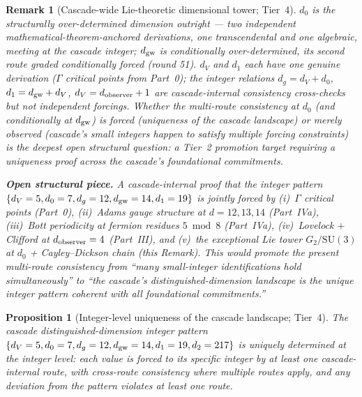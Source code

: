 \documentclass[12pt,a4paper]{article}
\newtheorem{proposition}[theorem]{Proposition}
\newtheorem*{remark}{Remark}
\begin{document}
\begin{remark}[Cascade-wide Lie-theoretic dimensional tower; Tier~4]
$d_0$ is the structurally over-determined dimension outright --- two independent mathematical-theorem-anchored derivations, one transcendental and one algebraic, meeting at the cascade integer; $d_{\rm gw}$ is \emph{conditionally} over-determined, its second route graded conditionally forced (round 51). $d_V$ and $d_1$ each have one genuine derivation ($\Gamma$ critical points from Part~0); the integer relations $d_g = d_V + d_0$, $d_1 = d_{\rm gw} + d_V$, $d_V = d_{\rm observer}+1$ are cascade-internal consistency cross-checks but not independent forcings. Whether the multi-route consistency at $d_0$ (and conditionally at $d_{\rm gw}$) is \emph{forced} (uniqueness of the cascade landscape) or merely \emph{observed} (cascade's small integers happen to satisfy multiple forcing constraints) is the deepest open structural question: a Tier~2 promotion target requiring a uniqueness proof across the cascade's foundational commitments.

\medskip\noindent\textbf{Open structural piece.} A cascade-internal proof that the integer pattern $\{d_V=5, d_0=7, d_g=12, d_{\rm gw}=14, d_1=19\}$ is jointly forced by (i)~$\Gamma$ critical points (Part~0), (ii)~Adams gauge structure at $d=12,13,14$ (Part~IVa), (iii)~Bott periodicity at fermion residues $5\bmod 8$ (Part~IVa), (iv)~Lovelock $+$ Clifford at $d_{\rm observer}=4$ (Part~III), and (v)~the exceptional Lie tower $G_2/\mathrm{SU}(3)$ at $d_0$ + Cayley--Dickson chain (this Remark). This would promote the present multi-route consistency from ``many small-integer identifications hold simultaneously'' to ``the cascade's distinguished-dimension landscape is the unique integer pattern coherent with all foundational commitments.''
\end{remark}

\begin{proposition}[Integer-level uniqueness of the cascade landscape; Tier~4]\label{prop:landscape-uniqueness}
The cascade distinguished-dimension integer pattern $\{d_V=5, d_0=7, d_g=12, d_{\rm gw}=14, d_1=19, d_2=217\}$ is uniquely determined at the integer level: each value is forced to its specific integer by at least one cascade-internal route, with cross-route consistency where multiple routes apply, and any deviation from the pattern violates at least one route.
\end{proposition}
\end{document}
